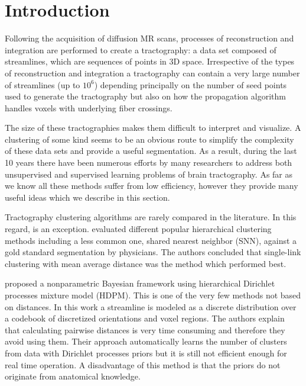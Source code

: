 \documentclass{bioinfo}
\begin{document}
\section{Introduction}

Following the acquisition of diffusion MR scans, processes of
reconstruction and integration are performed to create a tractography: a
data set composed of streamlines, which are sequences of points in 3D
space. Irrespective of the types of reconstruction and integration a
tractography can contain a very large number of streamlines (up to
$10^6$) depending principally on the number of seed points used to
generate the tractography but also on how the propagation algorithm
handles voxels with underlying fiber crossings.

The size of these tractographies makes them difficult to interpret and
visualize. A clustering of some kind seems to be an obvious route to
simplify the complexity of these data sets and provide a useful
segmentation.  As a result, during the last 10 years there have been
numerous efforts by many researchers to address both unsupervised and
supervised learning problems of brain tractography. 
As far as we know all these methods suffer from
low efficiency, however they provide many useful ideas which we describe
in this section.

Tractography clustering algorithms are rarely compared in the
literature.  In this regard, \citet{moberts2005evaluation} is an
exception. \citeauthor{moberts2005evaluation} evaluated different
popular hierarchical clustering methods including a less common one,
shared nearest neighbor (SNN), against a gold standard segmentation by
physicians. The authors concluded that single-link clustering with mean
average distance was the method which performed best.

\citet{wang2010tractography} proposed a nonparametric Bayesian framework
using hierarchical Dirichlet processes mixture model (HDPM). This is one
of the very few methods not based on distances. In this work a
streamline is modeled as a discrete distribution over a codebook of
discretized orientations and voxel regions. The authors explain that
calculating pairwise distances is very time consuming and therefore they
avoid using them. Their approach automatically learns the number of
clusters from data with Dirichlet processes priors but it is still not
efficient enough for real time operation. A disadvantage of this method
is that the priors do not originate from anatomical knowledge.
\end{document}

